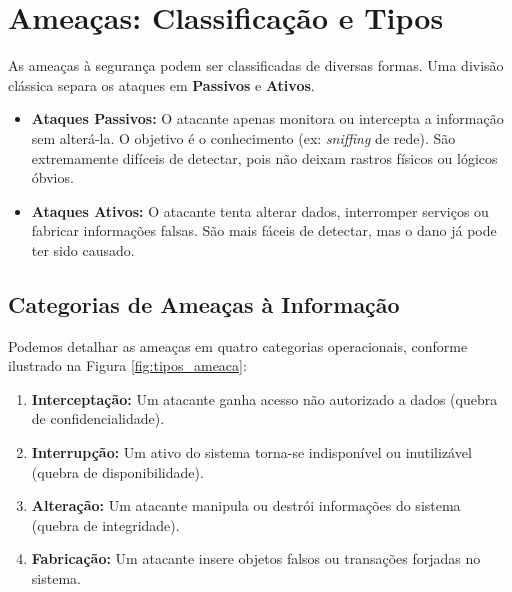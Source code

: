 \documentclass[12pt,a4paper,twoside]{report}
\begin{document}
\section{Ameaças: Classificação e Tipos}

As ameaças à segurança podem ser classificadas de diversas formas. Uma divisão clássica separa os ataques em \textbf{Passivos} e \textbf{Ativos}.

\begin{itemize}
    \item \textbf{Ataques Passivos:} O atacante apenas monitora ou intercepta a informação sem alterá-la. O objetivo é o conhecimento (ex: \emph{sniffing} de rede). São extremamente difíceis de detectar, pois não deixam rastros físicos ou lógicos óbvios.
    \item \textbf{Ataques Ativos:} O atacante tenta alterar dados, interromper serviços ou fabricar informações falsas. São mais fáceis de detectar, mas o dano já pode ter sido causado.
\end{itemize}

\subsection{Categorias de Ameaças à Informação}

Podemos detalhar as ameaças em quatro categorias operacionais, conforme ilustrado na Figura \ref{fig:tipos_ameaca}:

\begin{enumerate}
    \item \textbf{Interceptação:} Um atacante ganha acesso não autorizado a dados (quebra de confidencialidade).
    \item \textbf{Interrupção:} Um ativo do sistema torna-se indisponível ou inutilizável (quebra de disponibilidade).
    \item \textbf{Alteração:} Um atacante manipula ou destrói informações do sistema (quebra de integridade).
    \item \textbf{Fabricação:} Um atacante insere objetos falsos ou transações forjadas no sistema.
\end{enumerate}
\end{document}
